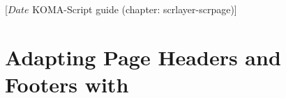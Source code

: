 %
%
%
%
%
%
%
%
% 
%
%
%
%

%
                 [$Date$
                  KOMA-Script guide (chapter: scrlayer-scrpage)]


\chapter[{Adapting Page Headers and Footers with \Package{scrlayer-scrpage}}]
  {Adapting Page Headers and
  Footers with }
%
\BeginIndexGroup
{}%

